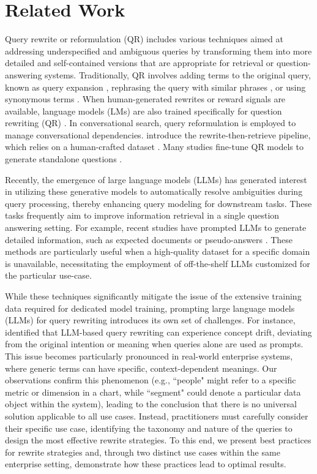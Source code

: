 \section{Related Work}
\label{sec:related-work}


Query rewrite or reformulation (QR) includes various techniques aimed at addressing underspecified and ambiguous queries by transforming them into more detailed and self-contained versions that are appropriate for retrieval or question-answering systems. Traditionally, QR involves adding terms to the original query, known as query expansion \cite{lavrenko2017relevance}, rephrasing the query with similar phrases \cite{zukerman2002lexical}, or using synonymous terms \cite{jones2006generating}. When human-generated rewrites or reward signals are available, language models (LMs) are also trained specifically for question rewriting (QR) \cite{elgohary2019can, anantha2021open, vakulenko2021question, qian2022explicit, ma2023query}. In conversational search, query reformulation is employed to manage conversational dependencies. \cite{anantha2021open} introduce the rewrite-then-retrieve pipeline, which relies on a human-crafted dataset \cite{elgohary2019can}. Many studies fine-tune QR models to generate standalone questions \cite{yu2020few, voskarides2020query, lin2021multi, kumar2020making, wu2022conqrr}.

Recently, the emergence of large language models (LLMs) has generated interest in utilizing these generative models to automatically resolve ambiguities during query processing, thereby enhancing query modeling for downstream tasks. These tasks frequently aim to improve information retrieval in a single question answering setting. For example, recent studies have prompted LLMs to generate detailed information, such as expected documents or pseudo-answers \cite{wang2023query2doc, jagerman2023query, anand2023context}. These methods are particularly useful when a high-quality dataset for a specific domain is unavailable, necessitating the employment of off-the-shelf LLMs customized for the particular use-case. 

While these techniques significantly mitigate the issue of the extensive training data required for dedicated model training, prompting large language models (LLMs) for query rewriting introduces its own set of challenges. For instance, \citet{anand2023context} identified that LLM-based query rewriting can experience concept drift, deviating from the original intention or meaning when queries alone are used as prompts. This issue becomes particularly pronounced in real-world enterprise systems, where generic terms can have specific, context-dependent meanings. Our observations confirm this phenomenon (e.g., ``people" might refer to a specific metric or dimension in a chart, while ``segment" could denote a particular data object within the system), leading to the conclusion that there is no universal solution applicable to all use cases. Instead, practitioners must carefully consider their specific use case,
identifying the taxonomy and nature of the queries to design the most effective rewrite strategies. To this end, we present best practices for rewrite strategies and, through two distinct use cases within the same enterprise setting, demonstrate how these practices lead to optimal results.